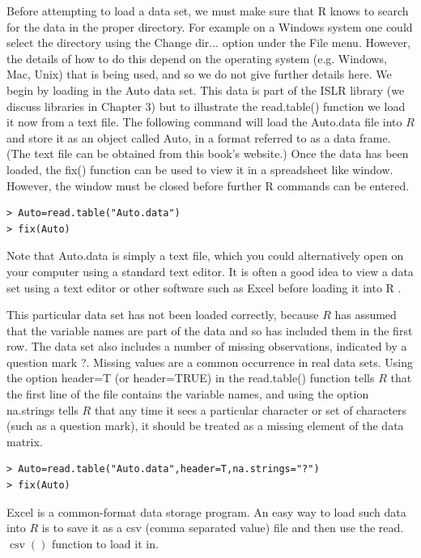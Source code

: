 \documentclass[10pt]{article}
\begin{document}
Before attempting to load a data set, we must make sure that R knows to search for the data in the proper directory. For example on a Windows system one could select the directory using the Change dir... option under the File menu. However, the details of how to do this depend on the operating system (e.g. Windows, Mac, Unix) that is being used, and so we do not give further details here. We begin by loading in the Auto data set. This data is part of the ISLR library (we discuss libraries in Chapter 3) but to illustrate the read.table() function we load it now from a text file. The following command will load the Auto.data file into $R$ and store it as an object called Auto, in a format referred to as a data frame. (The text file can be obtained from this book's website.) Once the data has been loaded, the fix() function can be used to view it in a spreadsheet like window. However, the window must be closed before further R commands can be entered.

\begin{verbatim}
> Auto=read.table("Auto.data")
> fix(Auto)
\end{verbatim}

Note that Auto.data is simply a text file, which you could alternatively open on your computer using a standard text editor. It is often a good idea to view a data set using a text editor or other software such as Excel before loading it into R .

This particular data set has not been loaded correctly, because $R$ has assumed that the variable names are part of the data and so has included them in the first row. The data set also includes a number of missing observations, indicated by a question mark ?. Missing values are a common occurrence in real data sets. Using the option header=T (or header=TRUE) in the read.table() function tells $R$ that the first line of the file contains the variable names, and using the option na.strings tells $R$ that any time it sees a particular character or set of characters (such as a question mark), it should be treated as a missing element of the data matrix.

\begin{verbatim}
> Auto=read.table("Auto.data",header=T,na.strings="?")
> fix(Auto)
\end{verbatim}

Excel is a common-format data storage program. An easy way to load such data into $R$ is to save it as a csv (comma separated value) file and then use the read. $\operatorname{csv}()$ function to load it in.
\end{document}
